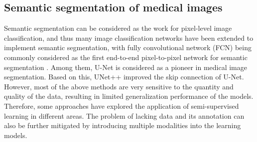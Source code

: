 \documentclass[lettersize,journal]{IEEEtran}
\begin{document}
\subsection{Semantic segmentation of medical images}
Semantic segmentation can be considered as the work for pixel-level image classification, and thus many image classification networks have been extended \cite{8long2015fully, 9chen2017deeplab, xu2022mrdff,xu2021multi} to implement semantic segmentation, with fully convolutional network (FCN) \cite{8long2015fully} being commonly considered as the first end-to-end pixel-to-pixel network for semantic segmentation \cite{Yuan2022}. Among them, U-Net \cite{14ronneberger2015u} is considered as a pioneer in medical image segmentation. Based on this, UNet++ \cite{15zhou2018unet++} improved the skip connection of U-Net. However, most of the above methods are very sensitive to the quantity and quality of the data, resulting in limited generalization performance of the models. Therefore, some approaches \cite{2li2021dual,li2021gt,21liu2020semi,li2022semi,20xia2020uncertainty} have explored the application of semi-supervised learning in different areas. The problem of lacking data and its annotation can also be further mitigated by introducing multiple modalities into the learning models. 
\end{document}
